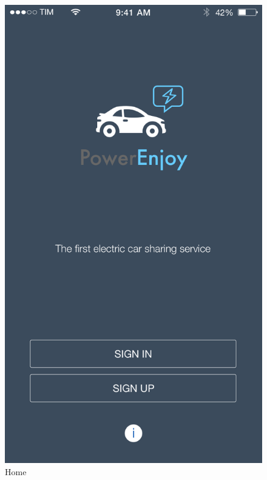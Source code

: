 \documentclass[12pt]{article}
\begin{document}
		\begin{figure}
		 \vspace{-17cm}	
		 \centering	
		 \includegraphics[scale=0.25]{Images/Home.png}
		 \caption{Home}
		 \endminipage
		 \centering

\end{figure}
\end{document}
